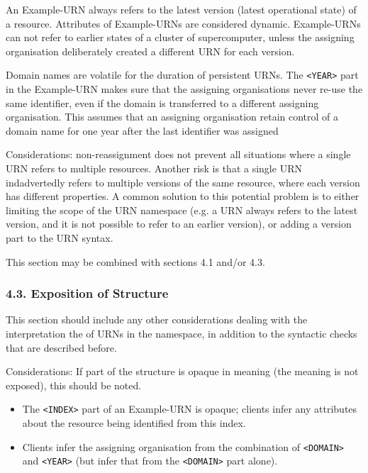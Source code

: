 \documentclass[12pt]{article}  %
\begin{document}
\begin{example}
An Example-URN always refers to the latest version (latest operational state) of 
a resource. Attributes of Example-URNs are considered dynamic. Example-URNs can 
not refer to earlier states of a cluster of supercomputer, unless the 
assigning organisation deliberately created a different URN for each version.

Domain names are volatile for the duration of persistent URNs. The \texttt{<YEAR>} 
part in the Example-URN makes sure that the assigning organisations never re-use the 
same identifier, even if the domain is transferred to a different assigning organisation.
This assumes that an assigning organisation \SHOULD{} retain control of a domain 
name for one year after the last identifier was assigned
\end{example}

Considerations: non-reassignment does not prevent all situations where a single 
URN refers to multiple resources. Another risk is that a single URN indadvertedly 
refers to multiple versions of the same resource, where each version has 
different properties. A common solution to this potential problem is to either 
limiting the scope of the URN namespace (e.g. a URN always refers to the latest 
version, and it is not possible to refer to an earlier version), or adding a 
version part to the URN syntax.

This section may be combined with sections 4.1 and/or 4.3.

\subsubsection*{4.3. Exposition of Structure}

This section should include any other considerations dealing with the
interpretation the of URNs in the namespace, in addition to the syntactic checks 
that are described before.

Considerations: If part of the structure is opaque in meaning (the meaning 
is not exposed), this should be noted. 

\begin{example}
\begin{itemize}
    \item The \texttt{<INDEX>} part of an Example-URN is opaque; 
      clients \MUSTNOT{} infer any attributes about the resource being 
      identified from this index.
    \item Clients \MAY{} infer the assigning organisation from the combination 
      of \texttt{<DOMAIN>} and \texttt{<YEAR>} (but \SHOULDNOT{} infer that 
      from the \texttt{<DOMAIN>} part alone).
\end{itemize}
\end{example}
\end{document}
